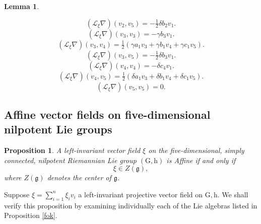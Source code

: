 \documentclass[10pt]{article}
\newtheorem{Lemma}{Lemma}
\newtheorem{Proposition}{Proposition}
\begin{document}
\begin{Lemma}
\begin{enumerate}
\begin{equation}
 (\mathscr{L}_\xi\nabla) (v_2,v_5)=-\tfrac{1}{2}\delta b_2v_1.  \label{74}  
\end{equation}
\begin{equation}
  (\mathscr{L}_\xi\nabla) (v_3,v_3)=-\gamma b_3v_1.\label{76}   
\end{equation}
\begin{equation}
 (\mathscr{L}_\xi\nabla) (v_3,v_4)=\tfrac{1}{2}(\gamma a_1 v_3+\gamma b_1 v_4 +\gamma c_1v_5).  \label{77}  
\end{equation}
\begin{equation}
  (\mathscr{L}_\xi\nabla) (v_3,v_5)=-\tfrac{1}{2}\delta b_3v_1.  \label{78} 
\end{equation}
\begin{equation}
  (\mathscr{L}_\xi\nabla) (v_4,v_4)=-\delta c_4 v_1. \label{79}  
\end{equation}
\begin{equation}
  (\mathscr{L}_\xi\nabla) (v_4,v_5)=\tfrac{1}{2}(\delta a_1 v_3 + \delta b_1v_4+ \delta c_1 v_5).  \label{80} 
\end{equation}
\begin{equation}
    (\mathscr{L}_\xi\nabla) (v_5,v_5)=0.
\end{equation}
\end{enumerate}
\end{Lemma}
\subsection{Affine vector fields on five-dimensional nilpotent Lie groups}


\begin{Proposition}
A left-invariant vector field $\xi$ on the five-dimensional, simply connected, nilpotent Riemannian Lie group $(\mathrm{G},\mathrm{h})$ is Affine if and only if
\[
\xi\in Z(\mathfrak{g}),
\]
where $Z(\mathfrak{g})$ denotes the center of $\mathfrak{g}$.
\end{Proposition}
Suppose \(\xi=\sum_{i=1}^n\xi_iv_i\) a left-invariant projective vector field on \(\mathrm{G},\mathrm{h}\). 
We shall verify this proposition by examining individually each of the Lie algebras listed in Proposition \ref{fok}.
\end{document}
